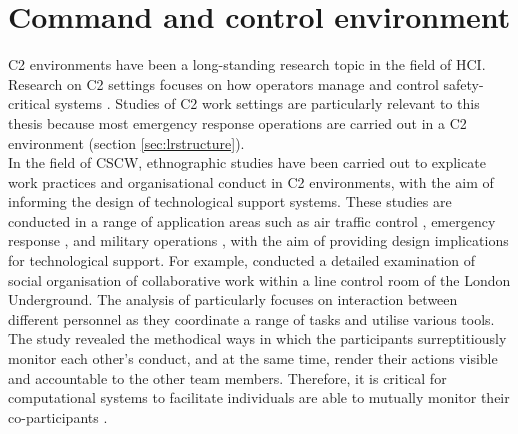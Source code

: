 

\section{Command and control environment}\label{sec:LRC2}
\acf{C2} environments have been a long-standing research topic in the field of \acf{HCI}. Research on \ac{C2} settings focuses on how operators manage and control safety-critical systems \citep{Fischer2015}. Studies of \ac{C2} work settings are particularly relevant to this thesis because most emergency response operations are carried out in a \ac{C2} environment (section \ref{sec:lrstructure}). \\

In the field of \ac{CSCW}, ethnographic studies have been carried out to explicate work practices and organisational conduct in \ac{C2} environments, with the aim of informing the design of technological support systems. These studies are conducted in a range of application areas such as air traffic control \citep{RichardH.R.HarperJohnA.Hughes1989}, emergency response \citep{Fischer2015} , and military operations \citep{Tolcher2005}, with the aim of providing design implications for technological support. For example, \cite{Heath1992} conducted a detailed examination of social organisation of collaborative work within a line control room of the London Underground. The analysis of \cite{Heath1992} particularly focuses on interaction between different personnel as they coordinate a range of tasks and utilise various tools. The study revealed the methodical ways in which the participants surreptitiously monitor each other's conduct, and at the same time, render their actions visible and accountable to the other team members. Therefore, it is critical for computational systems to facilitate individuals are able to mutually monitor their co-participants \citep{Heath1992}.\\

